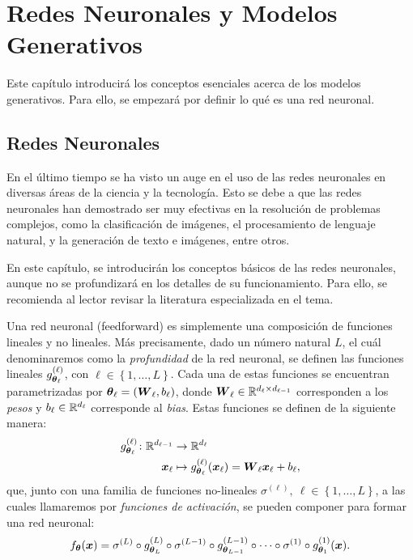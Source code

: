 \chapter{Redes Neuronales y Modelos Generativos}\label{chap:redes-neuronales-y-modelos-generativos}
{
Este capítulo introducirá los conceptos esenciales acerca de los modelos generativos. Para ello, se empezará por definir lo qué es una red neuronal.
\section{Redes Neuronales}\label{sec:redes-Neuronales}
{
En el último tiempo se ha visto un auge en el uso de las redes neuronales en diversas áreas de la ciencia y la tecnología. Esto se debe a que las redes neuronales han demostrado ser muy efectivas en la resolución de problemas complejos, como la clasificación de imágenes, el procesamiento de lenguaje natural, y la generación de texto e imágenes, entre otros.

En este capítulo, se introducirán los conceptos básicos de las redes neuronales, aunque no se profundizará en los detalles de su funcionamiento. Para ello, se recomienda al lector revisar la literatura especializada en el tema.

Una red neuronal (feedforward) es simplemente una composición de funciones lineales y no lineales. Más precisamente, dado un número natural $L$, el cuál denominaremos como la \emph{profundidad} de la red neuronal, se definen las funciones lineales $g^{(\ell)}_{\vb*{\theta}_\ell}$, con $\ell \in \left\{ 1, \ldots, L \right\}$. Cada una de estas funciones se encuentran parametrizadas por $\vb*{\theta}_\ell = (\vb*{W}_\ell, b_\ell)$, donde $\vb*{W}_\ell \in \mathbb{R}^{d_{\ell} \times d_{\ell-1}}$ corresponden a los \emph{pesos} y $b_\ell \in \mathbb{R}^{d_\ell}$ corresponde al \emph{bias}. Estas funciones se definen de la siguiente manera:
\begin{align*}
    g^{(\ell)}_{\vb*{\theta}_\ell} \colon \mathbb{R}^{d_{\ell-1}} & \to \mathbb{R}^{d_\ell}                                                        \\
    \vb*{x}_\ell                                      & \mapsto g^{(\ell)}_{\vb*{\theta}_\ell}(\vb*{x}_\ell) = \vb*{W}_\ell \vb*{x}_\ell + b_\ell,
\end{align*}
que, junto con una familia de funciones no-lineales $\sigma^{(\ell)},\ \ell \in \left\{ 1, \ldots, L \right\}$, a las cuales llamaremos por \emph{funciones de activación}, se pueden componer para formar una red neuronal:
\begin{equation}
    f_{\vb*{\theta}}(\vb*{x}) = \sigma^{(L)} \circ g^{(L)}_{\vb*{\theta}_L} \circ \sigma^{(L-1)} \circ g^{(L-1)}_{\vb*{\theta}_{L-1}} \circ \cdots \circ \sigma^{(1)} \circ g^{(1)}_{\vb*{\theta}_{1}}(\vb*{x}).
\end{equation}

}}
